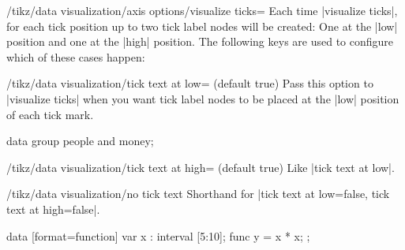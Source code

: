 \begin{key}{/tikz/data visualization/axis options/visualize ticks=}
    Each time |visualize ticks|, for each tick position up to two tick label
    nodes will be created: One at the |low| position and one at the |high|
    position. The following keys are used to configure which of these cases
    happen:
    \begin{key}{/tikz/data visualization/tick text at low= (default true)}
        Pass this option to |visualize ticks| when you want tick label nodes to
        be placed at the |low| position of each tick mark.
\begin{codeexample}[preamble={\usetikzlibrary{datavisualization}}]
%
\tikz \datavisualization [
    our system,
    x axis={attribute=time, length=3cm, ticks=some},
    left axis ={attribute=money},
    right axis={attribute=people},
    visualize as line/.list={people 1, people 2, money 1, money 2}]
  data group {people and money};
\end{codeexample}
    \end{key}
    \begin{key}{/tikz/data visualization/tick text at high= (default true)}
        Like |tick text at low|.
    \end{key}

    \begin{key}{/tikz/data visualization/no tick text}
        Shorthand for |tick text at low=false, tick text at high=false|.
\begin{codeexample}[preamble={\usetikzlibrary{datavisualization.formats.functions}}]
\tikz \datavisualization [scientific axes, all axes={length=3cm},
                          x axis={ticks={
                              major also at={6.5 as [no tick text]}}},
                          visualize as smooth line]
  data [format=function] {
    var x : interval [5:10];
    func y = \value x * \value x;
  };
\end{codeexample}
    \end{key}


\end{key}
